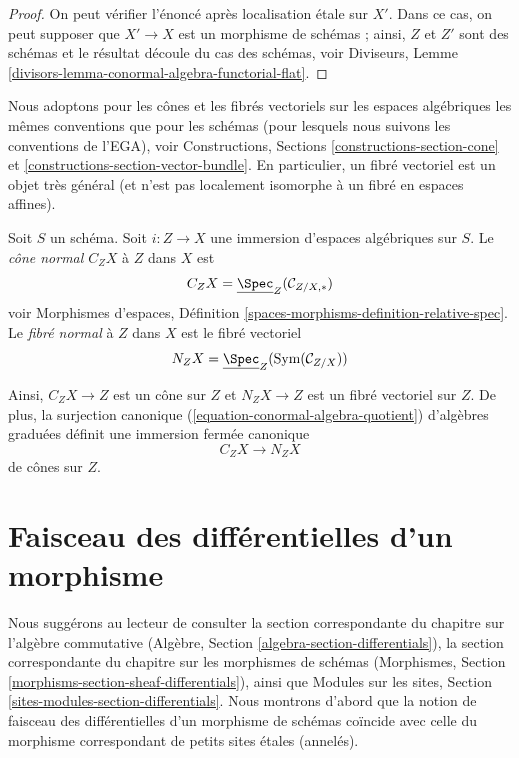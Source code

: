 \begin{proof}
On peut vérifier l'énoncé après localisation étale sur $X'$.
Dans ce cas, on peut supposer que $X' \to X$ est un morphisme de schémas ;
ainsi, $Z$ et $Z'$ sont des schémas et le résultat découle
du cas des schémas, voir
Diviseurs, Lemme \ref{divisors-lemma-conormal-algebra-functorial-flat}.
\end{proof}

\noindent
Nous adoptons pour les cônes et les fibrés vectoriels sur les
espaces algébriques les mêmes conventions que pour les schémas (pour lesquels nous suivons
les conventions de l'EGA), voir
Constructions, Sections \ref{constructions-section-cone} et
\ref{constructions-section-vector-bundle}.
En particulier, un fibré vectoriel est un objet très général
(et n'est pas localement isomorphe à un fibré en espaces affines).

\begin{definition}
\label{definition-normal-cone}
Soit $S$ un schéma. Soit $i : Z \to X$ une immersion d'espaces algébriques
sur $S$. Le {\it cône normal $C_ZX$} à $Z$ dans $X$ est
$$
C_ZX = \underline{\Spec}_Z(\mathcal{C}_{Z/X, *})
$$
voir Morphismes d'espaces,
Définition \ref{spaces-morphisms-definition-relative-spec}. Le
{\it fibré normal} à $Z$ dans $X$ est le fibré vectoriel
$$
N_ZX = \underline{\Spec}_Z(\text{Sym}(\mathcal{C}_{Z/X}))
$$
\end{definition}

\noindent
Ainsi, $C_ZX \to Z$ est un cône sur $Z$ et $N_ZX \to Z$ est un fibré vectoriel
sur $Z$. De plus, la surjection canonique
(\ref{equation-conormal-algebra-quotient}) d'algèbres graduées
définit une immersion fermée canonique
\begin{equation}
\label{equation-normal-cone-in-normal-bundle}
C_ZX \longrightarrow N_ZX
\end{equation}
de cônes sur $Z$.










\section{Faisceau des différentielles d'un morphisme}
\label{section-sheaf-differentials}

\noindent
Nous suggérons au lecteur de consulter la section correspondante
du chapitre sur l'algèbre commutative
(Algèbre, Section \ref{algebra-section-differentials}),
la section correspondante du chapitre sur les morphismes de schémas
(Morphismes, Section \ref{morphisms-section-sheaf-differentials}),
ainsi que
Modules sur les sites, Section \ref{sites-modules-section-differentials}.
Nous montrons d'abord que la notion de faisceau des différentielles d'un
morphisme de schémas coïncide avec celle du morphisme correspondant de
petits sites étales (annelés).

